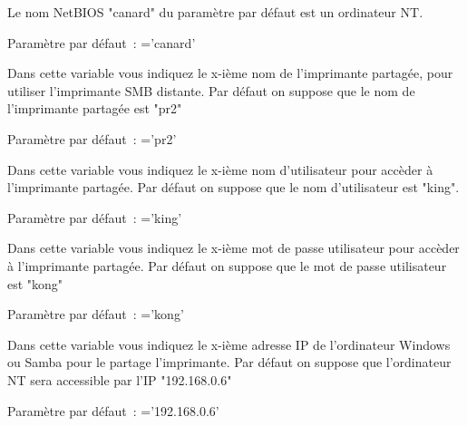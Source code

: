 \begin{description}
    Le nom NetBIOS "canard" du paramètre par défaut est un ordinateur NT.

    Paramètre par défaut~: ='canard'



    Dans cette variable  vous indiquez le
    x-ième nom de l'imprimante partagée, pour utiliser l'imprimante SMB distante.
    Par défaut on suppose que le nom de l'imprimante partagée est "pr2"

    Paramètre par défaut~: ='pr2'



    Dans cette variable  vous indiquez le
    x-ième nom d'utilisateur pour accèder à l'imprimante partagée.
    Par défaut on suppose que le nom d'utilisateur est "king".

    Paramètre par défaut~: ='king'



    Dans cette variable  vous indiquez le
    x-ième mot de passe utilisateur pour accèder à l'imprimante partagée.
    Par défaut on suppose que le mot de passe utilisateur est "kong"

    Paramètre par défaut~: ='kong'



    Dans cette variable  vous indiquez le
    x-ième adresse IP de l'ordinateur Windows ou Samba pour le partage l'imprimante.
    Par défaut on suppose que l'ordinateur NT sera accessible par l'IP "192.168.0.6"

    Paramètre par défaut~: ='192.168.0.6'

\end{description}




